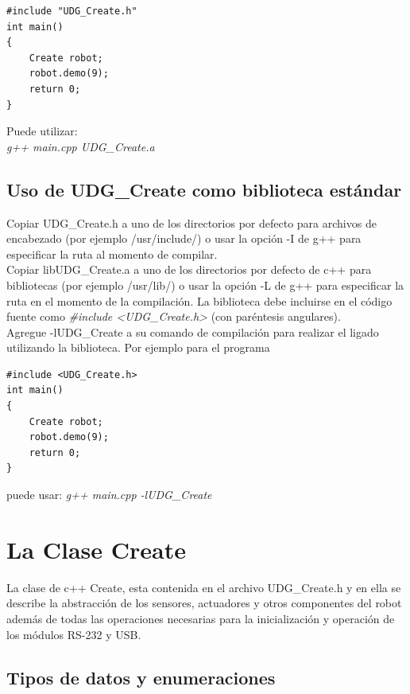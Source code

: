 \documentclass[letterpaper]{book}
\begin{document}
\begin{lstlisting}[caption={main.cpp}]
#include "UDG_Create.h"
int main()
{
	Create robot;
	robot.demo(9);
	return 0;
}

\end{lstlisting}

Puede utilizar:\\
\emph{g++ main.cpp UDG\_Create.a}

\section{Uso de UDG\_Create como biblioteca estándar}
Copiar UDG\_Create.h a uno de los directorios por defecto para archivos de encabezado (por ejemplo /usr/include/) o usar la opción -I de g++ para especificar la ruta al momento de compilar.\\
Copiar libUDG\_Create.a a uno de los directorios por defecto de c++ para bibliotecas (por ejemplo /usr/lib/) o usar la opción -L de g++ para especificar la ruta en el momento de la compilación.
La biblioteca debe  incluirse en el código fuente como \emph{\#include {\textless}UDG\_Create.h\textgreater} (con paréntesis angulares).\\
Agregue -lUDG\_Create a su comando de compilación para realizar el ligado utilizando la biblioteca. Por ejemplo para el programa\\
\begin{lstlisting}[caption={main.cpp}]
#include <UDG_Create.h>
int main()
{
	Create robot;
	robot.demo(9);
	return 0;
}

\end{lstlisting}

puede usar:
\emph{g++ main.cpp -lUDG\_Create}


\chapter{La Clase Create}
La clase de c++ Create, esta contenida en el archivo UDG\_Create.h y en ella se describe la abstracción de los sensores, actuadores y otros componentes del robot además de todas las operaciones necesarias para la inicialización y operación de los módulos RS-232 y USB.
\section{Tipos de datos y enumeraciones}
\end{document}
